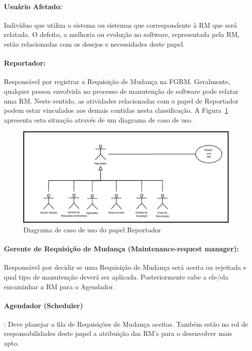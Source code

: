 \paragraph{Usuário Afetado:}
Indivíduo que utiliza o sistema ou sistemas que correspondente à RM que será
relatada. O defeito, a melhoria ou evolução no software, representada pela RM,
estão relacionadas com os desejos e necessidades deste papel.

\paragraph{Reportador:}
Responsável por registrar a Requisição de Mudança na FGRM\@. Geralmente,
qualquer pessoa envolvida no processo de manutenção de software pode relatar uma
RM. Neste sentido, as atividades relacionadas com o papel de Reportador podem
estar vinculados aos demais contidas nesta classificação. A
Figura~\ref{fig:diagrama-caso-uso-reportador} apresenta esta situação através de
um diagrama de caso de uso.

\begin{figure}[htpb]
	\centering
	\includegraphics[width=0.8\linewidth]{./chapter-manutencao-software-visao-geral/img/diagrama-caso-uso-reportador.pdf}
	\caption{Diagrama de caso de uso do papel Reportador}
	\label{fig:diagrama-caso-uso-reportador}
\end{figure}

\paragraph{Gerente de Requisição de Mudança (Maintenance-request manager):}
Res\-pon\-sá\-vel por decidir se uma Requisição de Mudança será aceita ou
rejeitada e qual tipo de manutenção deverá ser aplicada. Posteriormente cabe a
ele/ela encaminhar a RM para o Agendador.

\paragraph{Agendador (Scheduler)}:
Deve planejar a fila de Requisições de Mudança aceitas. Também estão no rol de
responsabilidades deste papel a atribuição das RM's para o desenvolver mais
apto.

